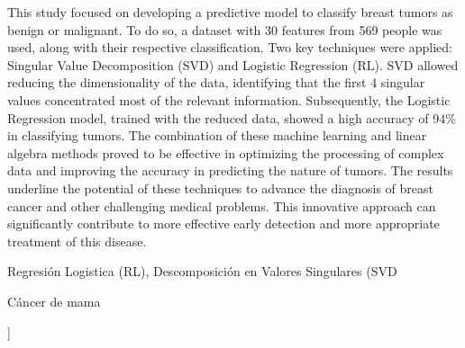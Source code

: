 \documentclass[a4paper,10pt,twocolumn]{article}
\begin{document}
\begin{enabstract}

 This study focused on developing a predictive model to classify breast tumors as benign or malignant. To do so, a dataset with 30 features from 569 people was used, along with their respective classification. Two key techniques were applied: Singular Value Decomposition (SVD) and Logistic Regression (RL). SVD allowed reducing the dimensionality of the data, identifying that the first 4 singular values ​​concentrated most of the relevant information. Subsequently, the Logistic Regression model, trained with the reduced data, showed a high accuracy of 94\% in classifying tumors.
The combination of these machine learning and linear algebra methods proved to be effective in optimizing the processing of complex data and improving the accuracy in predicting the nature of tumors. The results underline the potential of these techniques to advance the diagnosis of breast cancer and other challenging medical problems. This innovative approach can significantly contribute to more effective early detection and more appropriate treatment of this disease.
\end{enabstract}

\begin{keywords}
	Regresión Logistica (RL),
	Descomposición en Valores Singulares (SVD
\end{keywords}

\begin{topics}
	Cáncer de mama
\end{topics}


\vspace{0.8cm}
]



\end{document}

